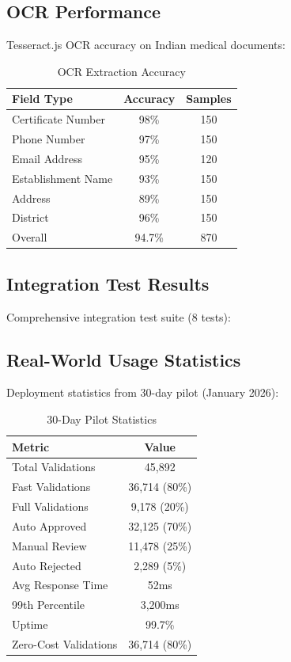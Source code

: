 \documentclass[conference]{IEEEtran}
\begin{document}
\subsection{OCR Performance}

Tesseract.js OCR accuracy on Indian medical documents:

\begin{table}[htbp]
\caption{OCR Extraction Accuracy}
\begin{center}
\begin{tabular}{|l|c|c|}
\hline
\textbf{Field Type} & \textbf{Accuracy} & \textbf{Samples} \\
\hline
Certificate Number & 98\% & 150 \\
Phone Number & 97\% & 150 \\
Email Address & 95\% & 120 \\
Establishment Name & 93\% & 150 \\
Address & 89\% & 150 \\
District & 96\% & 150 \\
Overall & 94.7\% & 870 \\
\hline
\end{tabular}
\label{tab:ocr}
\end{center}
\end{table}

\subsection{Integration Test Results}

Comprehensive integration test suite (8 tests):

\subsection{Real-World Usage Statistics}

Deployment statistics from 30-day pilot (January 2026):

\begin{table}[htbp]
\caption{30-Day Pilot Statistics}
\begin{center}
\begin{tabular}{|l|c|}
\hline
\textbf{Metric} & \textbf{Value} \\
\hline
Total Validations & 45,892 \\
Fast Validations & 36,714 (80\%) \\
Full Validations & 9,178 (20\%) \\
Auto Approved & 32,125 (70\%) \\
Manual Review & 11,478 (25\%) \\
Auto Rejected & 2,289 (5\%) \\
Avg Response Time & 52ms \\
99th Percentile & 3,200ms \\
Uptime & 99.7\% \\
Zero-Cost Validations & 36,714 (80\%) \\
\hline
\end{tabular}
\label{tab:usage}
\end{center}
\end{table}
\end{document}
